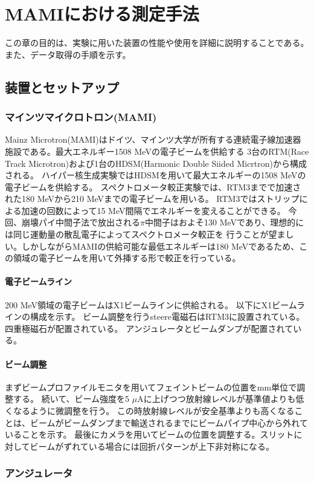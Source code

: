 \documentclass[a4paper,11pt,uplatex]{jsbook}
\begin{document}
\chapter{MAMIにおける測定手法}
この章の目的は、実験に用いた装置の性能や使用を詳細に説明することである。
また、データ取得の手順を示す。
\section{装置とセットアップ}
\subsection{マインツマイクロトロン(MAMI)}
Mainz Microtron(MAMI)はドイツ、マインツ大学が所有する連続電子線加速器施設である。最大エネルギー1508 MeVの電子ビームを供給する
3台のRTM(Race Track Microtron)および1台のHDSM(Harmonic Double Siided Micrtron)から構成される。
ハイパー核生成実験ではHDSMを用いて最大エネルギーの1508 MeVの電子ビームを供給する。
スペクトロメータ較正実験では、RTM3までで加速された180 MeVから210 MeVまでの電子ビームを用いる。
RTM3ではストリップによる加速の回数によって15 MeV間隔でエネルギーを変えることができる。
今回、崩壊パイ中間子法で放出される$\pi$中間子はおよそ130 MeVであり、理想的には同じ運動量の散乱電子によってスペクトロメータ較正を
行うことが望ましい。しかしながらMAMIの供給可能な最低エネルギーは180 MeVであるため、この領域の電子ビームを用いて外挿する形で較正を行っている。

\subsubsection{電子ビームライン}
200 MeV領域の電子ビームはX1ビームラインに供給される。
以下にX1ビームラインの構成を示す。
ビーム調整を行うsteere電磁石はRTM3に設置されている。
四重極磁石が配置されている。
アンジュレータとビームダンプが配置されている。


\subsubsection{ビーム調整}
まずビームプロファイルモニタを用いてフェイントビームの位置をmm単位で調整する。
続いて、ビーム強度を5 $\mu\text{A}$に上げつつ放射線レベルが基準値よりも低くなるように微調整を行う。
この時放射線レベルが安全基準よりも高くなることは、ビームがビームダンプまで輸送されるまでにビームパイプ中心から外れていることを示す。
最後にカメラを用いてビームの位置を調整する。スリットに対してビームがずれている場合には回折パターンが上下非対称になる。

\subsection{アンジュレータ}
\end{document}
